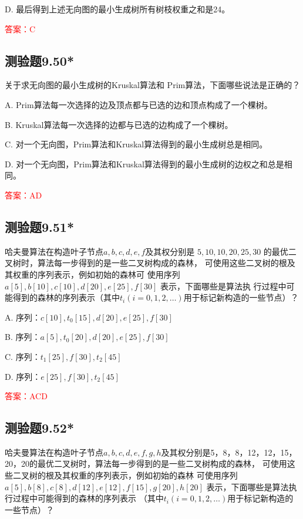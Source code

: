 \documentclass[UTF8, heading=true]{ctexart}
\begin{document}
D. 
最后得到上述无向图的最小生成树所有树枝权重之和是24。

\textcolor{red}{答案：C}

\subsection{测验题9.50*}

关于求无向图的最小生成树的Kruskal算法和
Prim算法，下面哪些说法是正确的？

A. Prim算法每一次选择的边及顶点都与已选的边和顶点构成了一个棵树。

B. Kruskal算法每一次选择的边都与已选的边构成了一个棵树。

C. 对一个无向图，Prim算法和Kruskal算法得到的最小生成树总是相同。

D. 
对一个无向图，Prim算法和Kruskal算法得到的最小生成树的边权之和总是相同。

\textcolor{red}{答案：AD}

\subsection{测验题9.51*}

哈夫曼算法在构造叶子节点$a,b,c,d,e,f$及其权分别是 $5,10,10,20,25,30$ 的最优二叉树时，算法每一步得到的是一些二叉树构成的森林，
可使用这些二叉树的根及其权重的序列表示，例如初始的森林可
使用序列 $a[5], b[10], c[10], d[20], e[25], f[30]$ 表示，下面哪些是算法执
行过程中可能得到的森林的序列表示（其中$t_i(i=0,1,2, \dots )$用于标记新构造的一些节点）？

A. 序列：$c[10],t_0[15],d[20],e[25],f[30]$

B. 序列：$a[5], t_0[20], d[20], e[25], f[30]$

C. 序列：$t_1[25],f[30], t_2[45]$

D. 序列：$e[25], f[30], t_2[45]$

\textcolor{red}{答案：ACD}

\subsection{测验题9.52*}

哈夫曼算法在构造叶子节点$a,b,c,d,e,f,g,h$及其权分别是5，8，8，12，12，15，20，20的最优二叉树时，算法每一步得到的是一些二叉树构成的森林，
可使用这些二叉树的根及其权重的序列表示，例如初始的森林
可使用序列$a[5],b[8],c[8],d[12],e[12],f[15],g[20],h[20]$
表示，下面哪些是算法执行过程中可能得到的森林的序列表示 （其中$t_{i}({i}=0,1,2, \ldots)$用于标记新构造的一些节点）？
\end{document}
